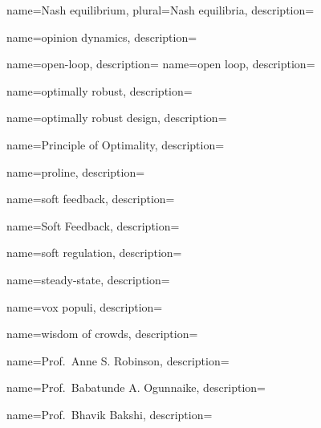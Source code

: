 	{
		name={Nash equilibrium},
		plural={Nash equilibria},
		description={}
	}
	

	{
		name={opinion dynamics},
		description={}
	}

	{
		name={open-loop},
		description={}
	}
	{
		name={open loop},
		description={}
	}	

	{
		name={optimally robust},
		description={}
	}
	
	{
		name={optimally robust design},
		description={}
	}
	

	{
		name={Principle of Optimality},
		description={}
	}

	{
		name={proline},
		description={}
	}


	{
		name={soft feedback},
		description={}
	}

	{
		name={Soft Feedback},
		description={}
	}

	{
		name={soft regulation},
		description={}
	}
	
	{
		name={steady-state},
		description={}
	}	
		

	{
		name={vox populi},
		description={}
	}	


	{
		name={wisdom of crowds},
		description={}
	}
	

	{
		name={Prof.~Anne S. Robinson},
		description={}
	}
	
	{
		name={Prof.~Babatunde A. Ogunnaike},
		description={}
	}	

	{
		name={Prof.~Bhavik Bakshi},
		description={}
	}
	
